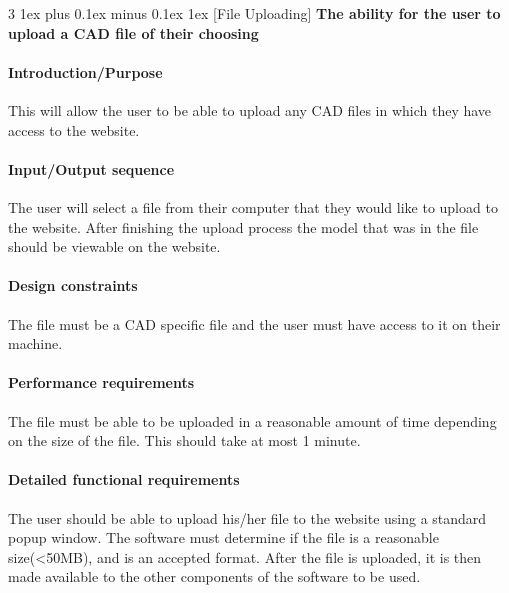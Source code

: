 \documentclass[letterpaper, 10pt, draftclsnofoot, compsoc, onecolumn]{IEEEtran}
\makeatletter
\def\subsubsection{\@startsection{subsubsection}%
                                 {3}%
                                 {\z@}%
                                 {1ex plus 0.1ex minus 0.1ex}%
                                 {1ex}%
                                 {\normalfont\normalsize}}%
\makeatother
\begin{document}
\subsubsection[{File Uploading}]{\rmfamily\bfseries\color{black}
	The ability for the user to upload a CAD file of their choosing
}


\paragraph[Introduction/Purpose of this feature]
{\rmfamily\bfseries\color{black} Introduction/Purpose }
	This will allow the user to be able to upload any CAD files in which they have access to the website.

\paragraph[Input/Output sequence:]{\rmfamily\bfseries\color{black}
Input/Output sequence }
	The user will select a file from their computer that they would like to upload to the website. After finishing the upload process 
	the model that was in the file should be viewable on the website. 

\paragraph[Design constraints of this
feature]{\rmfamily\bfseries\color{black} Design
constraints }
	The file must be a CAD specific file and the user must have access to it on their machine. 

\paragraph[Performance requirements of this
feature]{\rmfamily\bfseries\color{black}
Performance requirements }
	The file must be able to be uploaded in a reasonable amount of time depending on the size of the file. This should take at 
	most 1 minute. 


\paragraph[Detailed functional requirements of this
feature]{\rmfamily\bfseries\color{black}
Detailed functional requirements }
	The user should be able to upload his/her file to the website using a standard popup window. The software must determine if 
	the file is a reasonable size(<50MB), and is an accepted format. After the file is uploaded, it is then made available to the 
	other components of the software to be used.
\end{document}
